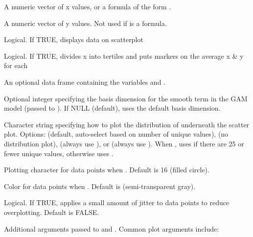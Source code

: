 \documentclass[a4paper]{book}
\begin{document}
\begin{Arguments}
\begin{ldescription}
\item[\code{x}] A numeric vector of x values, or a formula of the form .

\item[\code{y}] A numeric vector of y values. Not used if  is a formula.

\item[\code{data.dots}] Logical. If TRUE, displays data on scatterplot

\item[\code{three.dots}] Logical. If TRUE, divides x into tertiles and puts markers on the average  x \& y for each

\item[\code{data}] An optional data frame containing the variables  and .

\item[\code{k}] Optional integer specifying the basis dimension for the smooth term
in the GAM model (passed to ). If NULL (default), uses the
default basis dimension.

\item[\code{plot.dist}] Character string specifying how to plot the distribution of 
underneath the scatter plot. Options:  (default, auto-select based on
number of unique values),  (no distribution plot), 
(always use ), or  (always use ).
When , uses  if there are 25 or fewer unique values,
otherwise uses .

\item[\code{dot.pch}] Plotting character for data points when .
Default is 16 (filled circle).

\item[\code{dot.col}] Color for data points when . Default is
 (semi-transparent gray).

\item[\code{jitter}] Logical. If TRUE, applies a small amount of jitter to data points
to reduce overplotting. Default is FALSE.

\item[\code{...}] Additional arguments passed to  and .
Common plot arguments include:
\begin{itemize}


\end{itemize}
\end{ldescription}
\end{Arguments}
\end{document}
